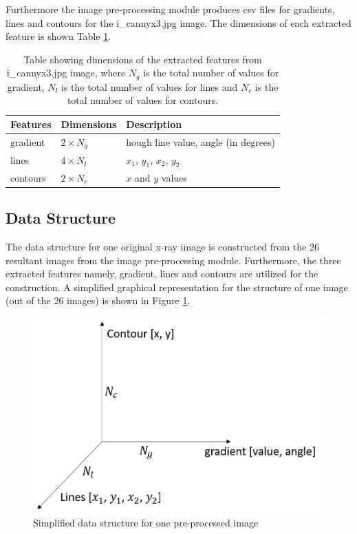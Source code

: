 \documentclass[11pt]{article}
\begin{document}
	Furthermore the image pre-processing module produces csv files for gradients, lines and contours for the i\_cannyx3.jpg image. The dimensions of each extracted feature is shown Table \ref{feature_selection}.
	\begin{table}[!h]
		\centering
		\caption{Table showing dimensions of the extracted features from i\_cannyx3.jpg image, where $N_g$ is the total number of values for gradient, $N_l$ is the total number of values for lines and $N_c$ is the total number of values for contours.}
		\label{feature_selection}
		\begin{tabular}{|l|l|l|}
			\hline
			Features & Dimensions & Description \\
			\hline \hline
			gradient & $2 \times N_g $ & hough line value, angle (in degrees)\\
			\hline
			lines    & $4 \times N_l $ & $x_{1}$, $y_{1}$, $x_{2}$, $y_{2}$ \\
			\hline
			contours & $2 \times N_c $  & $x$ and $y$ values \\
			\hline
		\end{tabular}
	\end{table}
	
	\newpage
	\subsection{Data Structure}
	The data structure for one original x-ray image is constructed from the 26 resultant images from the image pre-processing module. Furthermore, the three extracted features namely, gradient, lines and contours are utilized for the construction. A simplified graphical representation for the structure of one image (out of the 26 images) is shown in Figure \ref{fig: second_structure}. 
	\begin{figure}[!h]
		\centering
		\includegraphics[scale=0.35]{second_structure.png}
		\caption{Simplified data structure for one pre-processed image}
		\label{fig: second_structure}
	\end{figure}
\end{document}
